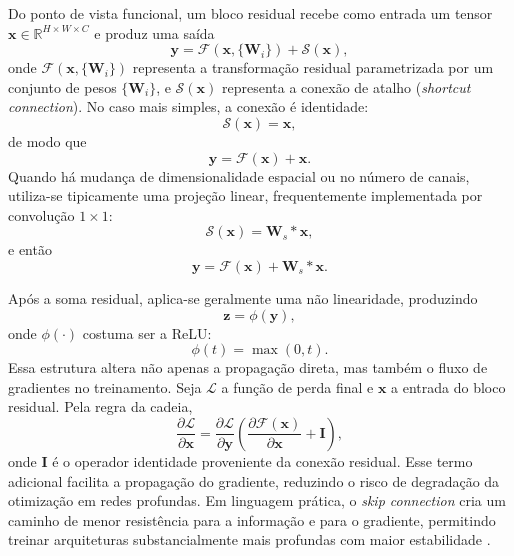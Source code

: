 \documentclass[tcc,capa]{texufpel}
\begin{document}
Do ponto de vista funcional, um bloco residual recebe como entrada um tensor \(\mathbf{x}\in\mathbb{R}^{H\times W \times C}\) e produz uma saída
\begin{equation}
	\mathbf{y} = \mathcal{F}(\mathbf{x}, \{\mathbf{W}_i\}) + \mathcal{S}(\mathbf{x}),
\end{equation}
onde \(\mathcal{F}(\mathbf{x}, \{\mathbf{W}_i\})\) representa a transformação residual parametrizada por um conjunto de pesos \(\{\mathbf{W}_i\}\), e \(\mathcal{S}(\mathbf{x})\) representa a conexão de atalho (\textit{shortcut connection}). No caso mais simples, a conexão é identidade:
\begin{equation}
	\mathcal{S}(\mathbf{x}) = \mathbf{x},
\end{equation}
de modo que
\begin{equation}
	\mathbf{y} = \mathcal{F}(\mathbf{x}) + \mathbf{x}.
\end{equation}
Quando há mudança de dimensionalidade espacial ou no número de canais, utiliza-se tipicamente uma projeção linear, frequentemente implementada por convolução \(1\times1\):
\begin{equation}
	\mathcal{S}(\mathbf{x}) = \mathbf{W}_{s} * \mathbf{x},
\end{equation}
e então
\begin{equation}
	\mathbf{y} = \mathcal{F}(\mathbf{x}) + \mathbf{W}_{s} * \mathbf{x}.
\end{equation}

Após a soma residual, aplica-se geralmente uma não linearidade, produzindo
\begin{equation}
	\mathbf{z} = \phi(\mathbf{y}),
\end{equation}
onde \(\phi(\cdot)\) costuma ser a ReLU:
\begin{equation}
	\phi(t) = \max(0,t).
\end{equation}
Essa estrutura altera não apenas a propagação direta, mas também o fluxo de gradientes no treinamento. Seja \(\mathcal{L}\) a função de perda final e \(\mathbf{x}\) a entrada do bloco residual. Pela regra da cadeia,
\begin{equation}
	\frac{\partial \mathcal{L}}{\partial \mathbf{x}}
	=
	\frac{\partial \mathcal{L}}{\partial \mathbf{y}}
	\left(
	\frac{\partial \mathcal{F}(\mathbf{x})}{\partial \mathbf{x}}
	+
	\mathbf{I}
	\right),
\end{equation}
onde \(\mathbf{I}\) é o operador identidade proveniente da conexão residual. Esse termo adicional facilita a propagação do gradiente, reduzindo o risco de degradação da otimização em redes profundas. Em linguagem prática, o \textit{skip connection} cria um caminho de menor resistência para a informação e para o gradiente, permitindo treinar arquiteturas substancialmente mais profundas com maior estabilidade \cite{He2016}.
\end{document}
